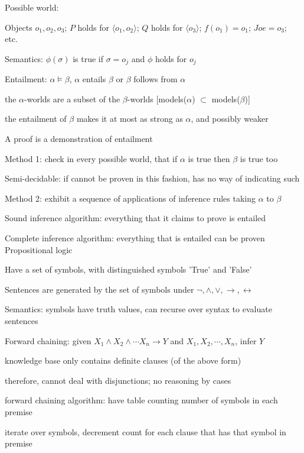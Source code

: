 \documentclass[12pt]{article}
\begin{document}
Possible world:

Objects $o_1, o_2, o_3$; $P$ holds for $\langle o_1, o_2 \rangle$; $Q$ holds for $\langle o_3 \rangle$; $f(o_1) = o_1$; $Joe = o_3$; etc.

Semantics: $\phi(\sigma)$ is true if $\sigma=o_j$ and $\phi$ holds for $o_j$

\noindent
Entailment: $\alpha \models \beta$, $\alpha$ entails $\beta$ or $\beta$ follows from $\alpha$

the $\alpha$-worlds are a subset of the $\beta$-worlds [models($\alpha$) $\subset$ models($\beta$)]

the entailment of $\beta$ makes it at most as strong as $\alpha$, and possibly weaker

\noindent
A proof is a demonstration of entailment

\noindent
Method 1: check in every possible world, that if $\alpha$ is true then $\beta$ is true too

Semi-decidable: if cannot be proven in this fashion, has no way of indicating such

\noindent
Method 2: exhibit a sequence of applications of inference rules taking $\alpha$ to $\beta$

\noindent
Sound inference algorithm: everything that it claims to prove is entailed

\noindent
Complete inference algorithm: everything that is entailed can be proven\\

\noindent
Propositional logic

Have a set of symbols, with distinguished symbols 'True' and 'False'

Sentences are generated by the set of symbols under $\neg, \wedge, \vee, \to, \leftrightarrow$

Semantics: symbols have truth values, can recurse over syntax to evaluate sentences

\noindent
Forward chaining: given $X_1 \wedge X_2 \wedge \cdots X_n \to Y$ and $X_1, X_2, \cdots, X_n$, infer $Y$

knowledge base only contains definite clauses (of the above form)

therefore, cannot deal with disjunctions; no reasoning by cases

forward chaining algorithm: have table counting number of symbols in each premise

iterate over symbols, decrement count for each clause that has that symbol in premise
\end{document}
